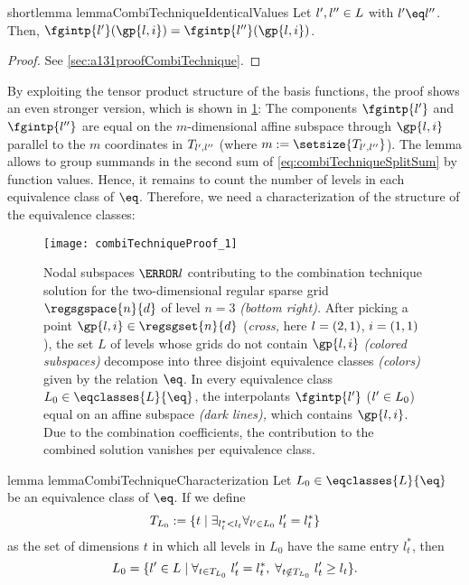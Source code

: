 \begin{restatable}{%
  shortlemma%
}{%
  lemmaCombiTechniqueIdenticalValues%
}
  \label{lemma:combiTechniqueIdenticalValues}
  Let $\*l', \*l'' \in L$ with $\*l' \eq \*l''$.
  Then, $\fgintp{\*l'}(\gp{\*l,\*i})
  = \fgintp{\*l''}(\gp{\*l,\*i})$.
\end{restatable}

\begin{proof}
  See \cref{sec:a131proofCombiTechnique}.
\end{proof}

By exploiting the tensor product structure of the basis functions,
the proof shows an even stronger version, which is shown
in \cref{fig:combiTechniqueProof}:
The components $\fgintp{\*l'}$ and $\fgintp{\*l''}$ are equal
on the $m$-dimensional affine subspace through $\gp{\*l,\*i}$
parallel to the $m$ coordinates in $T_{\*l',\*l''}$
(where $m := \setsize{T_{\*l',\*l''}}$).
The lemma allows to group summands in the second sum of
\eqref{eq:combiTechniqueSplitSum} by function values.
Hence, it remains to count the number of levels in
each equivalence class of $\eq$.
Therefore, we need a characterization of the structure
of the equivalence classes:

\begin{SCfigure}
  \texttt{[image: combiTechniqueProof\_1]}%
  \caption[%
    Canceling out function values in the proof of the combination technique%
  ]{%
    Nodal subspaces $\ns{\*l}$ contributing to the combination
    technique solution for the two-dimensional regular sparse grid
    $\regsgspace{n}{d}$ of level $n = 3$ \emph{(bottom right).}
    After picking a point $\gp{\*l,\*i} \in \regsgset{n}{d}$
    (\emph{cross,} here $\*l = (2, 1)$, $\*i = (1, 1)$),
    the set $L$ of levels whose grids do not contain $\gp{\*l,\*i}$
    \emph{(colored subspaces)}
    decompose into three disjoint equivalence classes
    \emph{(colors)} given by the relation $\eq$.
    In every equivalence class $L_0 \in \eqclasses{L}{\eq}$,
    the interpolants $\fgintp{\*l'}$ ($\*l' \in L_0$)
    equal on an affine subspace
    \emph{(dark lines),} which contains $\gp{\*l,\*i}$.
    Due to the combination coefficients,
    the contribution to the combined solution
    vanishes per equivalence class.%
  }%
  \label{fig:combiTechniqueProof}%
\end{SCfigure}

\begin{restatable}{%
  lemma%
}{%
  lemmaCombiTechniqueCharacterization%
}
  \label{lemma:combiTechniqueCharacterization}
  Let $L_0 \in \eqclasses{L}{\eq}$ be an equivalence class of $\eq$.
  If we define
  \begin{equation}
    T_{L_0}
    := \{t \mid \exfa{l^\ast_t < l_t}{\*l' \in L_0}{l'_t = l^\ast_t}\}
  \end{equation}
  as the set of dimensions $t$ in which all levels in $L_0$
  have the same entry $l^\ast_t$, then
  \begin{equation}
    L_0
    = \{\*l' \in L \mid
    \fa{t \in T_{L_0}}{l'_t = l^\ast_t},\;
    \fa{t \notin T_{L_0}}{l'_t \ge l_t}\}.
  \end{equation}
\end{restatable}

